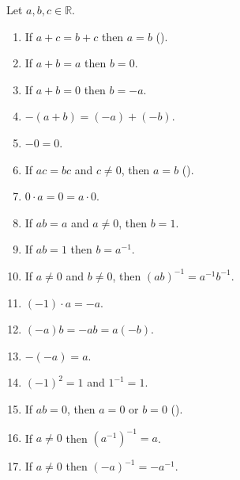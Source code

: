\begin{lemma} %
	\label{rpr:l:props}
	Let $a, b, c \in \mathbb{R}$.
	\begin{enumerate}
		\item \label{rpr:l:props:1}
		      If $a + c = b + c$ then $a = b$ \quad (). 
		\item \label{rpr:l:props:2}
		      If $a + b = a$ then $b = 0$.
		\item \label{rpr:l:props:3}
		      If $a + b = 0$ then $b = -a$.
		\item \label{rpr:l:props:4}
		      $-(a + b) = (-a) + (-b)$.
		\item \label{rpr:l:props:5}
		      $-0 = 0$.
		\item \label{rpr:l:props:6}
		      If $a c = b c$ and $c \neq 0$, then $a = b$ \quad (). 
		\item \label{rpr:l:props:7}
		      $0 \cdot a = 0 = a \cdot 0$.
		\item \label{rpr:l:props:8}
		      If $a b = a$ and $a \neq 0$, then $b = 1$.
		\item \label{rpr:l:props:9}
		      If $a b = 1$ then $b = a^{-1}$.
		\item \label{rpr:l:props:10}
		      If $a \neq 0$ and $b \neq 0$, then $(a b)^{-1} = a^{-1} b^{-1}$.
		\item \label{rpr:l:props:11}
		      $(-1) \cdot a = -a$.
		\item \label{rpr:l:props:12}
		      $(-a) b = -a b = a(-b)$.
		\item \label{rpr:l:props:13}
		      $-(-a) = a$.
		\item \label{rpr:l:props:14}
		      $(-1)^{2} = 1$ and $1^{-1} = 1$.
		\item \label{rpr:l:props:15}
		      If $a b = 0$, then $a = 0$ or $b = 0$  \quad (). 
		\item \label{rpr:l:props:16}
		      If $a \neq 0$ then $(a^{-1})^{-1} = a$.
		\item \label{rpr:l:props:17}
		      If $a \neq 0$ then $(-a)^{-1} = -a^{-1}$.
	\end{enumerate}
\end{lemma}

